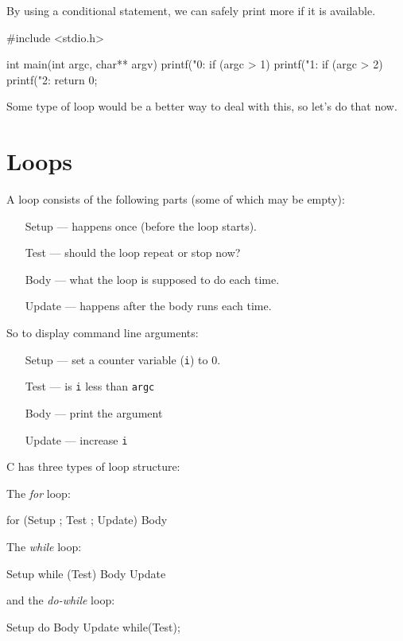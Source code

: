 By using a conditional statement, we can safely print more if it is available.
\begin{codeblock}
#include <stdio.h>

int main(int argc, char** argv) {
    printf("0: %
    if (argc > 1) {
      printf("1: %
    }
    if (argc > 2) {
      printf("2: %
    }
    return 0;
}
\end{codeblock}
Some type of loop would be a better way to deal with this, so let's do that now.

\section{Loops}
A loop consists of the following parts (some of which may be empty):
\begin{itemize}
 \item [Setup] --- happens once (before the loop starts).
 \item [Test]  --- should the loop repeat or stop now?
 \item [Body]  --- what the loop is supposed to do each time.
 \item [Update] --- happens after the body runs each time.
\end{itemize}

So to display command line arguments:
\begin{itemize}
 \item [Setup] --- set a counter variable (\texttt{i}) to 0.
 \item [Test]  --- is \texttt{i} less than \texttt{argc}
 \item [Body]  --- print the argument
 \item [Update] --- increase \texttt{i}
\end{itemize}

C has three types of loop structure:

The \emph{for} loop:
\begin{codeinline}
for (Setup ; Test ; Update) {
    Body
}
\end{codeinline}

The \emph{while} loop:
\begin{codeinline}
Setup
while (Test) {
    Body
    Update
}
\end{codeinline}

and the \emph{do-while} loop:
\begin{codeinline}
Setup
do {
    Body
    Update
} while(Test);
\end{codeinline}

